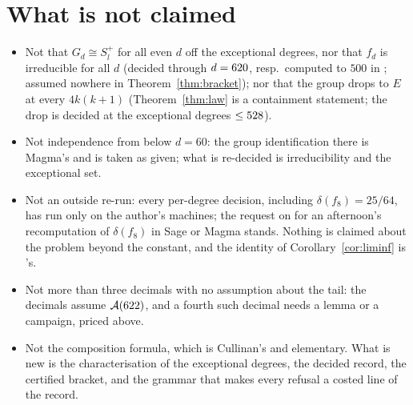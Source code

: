 \documentclass[11pt]{article}
\newcommand{\Sl}{S_l^{+}}
\begin{document}
\section{What is not claimed}\label{sec:not}

\begin{itemize}
\item Not that $G_d\cong\Sl$ for all even $d$ off the exceptional degrees, nor that $f_d$ is irreducible for all $d$ (decided through $d=620$, resp.\ computed to $500$ in \cite{vD24}; assumed nowhere in Theorem~\ref{thm:bracket}); nor that the group drops to $E$ at every $4k(k+1)$ (Theorem~\ref{thm:law} is a containment statement; the drop is decided at the \ExcCount{} exceptional degrees $\le528$).
\item Not independence from \cite{vD24} below $d=60$: the group identification there is Magma's and is taken as given; what is re-decided is irreducibility and the exceptional set.
\item Not an outside re-run: every per-degree decision, including $\delta(f_8)=25/64$, has run only on the author's machines; the request on \cite{Issue164} for an afternoon's recomputation of $\delta(f_8)$ in Sage or Magma stands. Nothing is claimed about the problem beyond the constant, and the identity of Corollary~\ref{cor:liminf} is \cite{vD26}'s.
\item Not more than three decimals with no assumption about the tail: the \CStarDigits{} decimals assume $\mathcal A(622)$, and a fourth such decimal needs a lemma or a campaign, priced above.
\item Not the composition formula, which is Cullinan's \cite{Cullinan} and elementary. What is new is the characterisation of the exceptional degrees, the decided record, the certified bracket, and the grammar that makes every refusal a costed line of the record.
\end{itemize}
\end{document}
